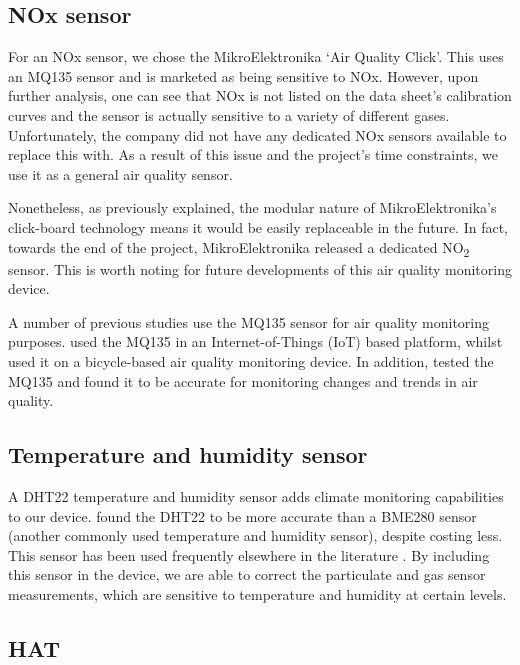 \documentclass[11pt]{report}
\begin{document}
\subsection{NOx sensor}

For an NOx sensor, we chose the MikroElektronika `Air Quality Click'. This uses an MQ135 sensor and is marketed as being sensitive to NOx. However, upon further analysis, one can see that NOx is not listed on the data sheet's calibration curves and the sensor is actually sensitive to a variety of different gases. Unfortunately, the company did not have any dedicated NOx sensors available to replace this with. As a result of this issue and the project's time constraints, we use it as a general air quality sensor.

Nonetheless, as previously explained, the modular nature of MikroElektronika's click-board technology means it would be easily replaceable in the future. In fact, towards the end of the project, MikroElektronika released a dedicated NO\textsubscript{2} sensor. This is worth noting for future developments of this air quality monitoring device.

A number of previous studies use the MQ135 sensor for air quality monitoring purposes. \cite{Rahman2017adaptivesensingRPi} used the MQ135 in an Internet-of-Things (IoT) based platform, whilst \cite{anderson2012noxdroid} used it on a bicycle-based air quality monitoring device. In addition, \cite{garnier2017mythorreality} tested the MQ135 and found it to be accurate for monitoring changes and trends in air quality.

\subsection{Temperature and humidity sensor}

A DHT22 temperature and humidity sensor adds climate monitoring capabilities to our device. \cite{garnier2017mythorreality} found the DHT22 to be more accurate than a BME280 sensor (another commonly used temperature and humidity sensor), despite costing less. This sensor has been used frequently elsewhere in the literature \citep{Rahman2017adaptivesensingRPi, ibrahim2015IOTenvmon, alkandari2018airqualityexperimental}. By including this sensor in the device, we are able to correct the particulate and gas sensor measurements, which are sensitive to temperature and humidity at certain levels.

\subsection{HAT}
\end{document}
